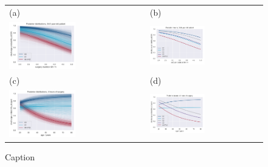 \documentclass{elsarticle}
\begin{document}
\begin{figure}
    \centering
    \begin{tabular}{ll}
(a)  & (b) \\
\includegraphics[width=0.5\textwidth]{images/DS19fk1_c0__p_LoS__model_B__traces_V0_V4-12__age_mean.png}&
\includegraphics[width=0.5\textwidth]{images/DS19fk1_c0__p_LoS__model_B__mean__age_mean.pdf}\\
(c) & (d) \\
\includegraphics[width=0.5\textwidth]{images/DS19fk1_c0__p_age__model_B__traces__LoS_4h.png}&
\includegraphics[width=0.5\textwidth]{images/DS19fk1_c0__p_age__model_B__mean__LoS_4h.pdf}\\
\end{tabular}
    \caption{Caption}
    \label{fig:posterior}
\end{figure}
\end{document}
